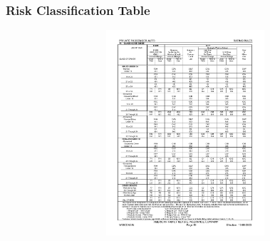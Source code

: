 \begin{frame}[shrink=2]
 \frametitle{Risk Classification Table}

\begin{figure}[htp]
  \begin{center}
    \includegraphics[natheight=5in, natwidth=8in, height=3in,
width=5in]{Chapter4/wiclassonly.pdf}
  \end{center}
\end{figure}
\end{frame}


